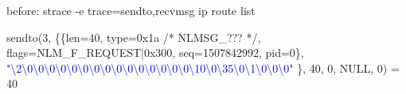 \documentclass[unicode,aspectratio=169]{beamer}
\begin{document}
\begin{frame}[fragile]{\small before: strace -e trace=sendto,recvmsg ip route list}

{\texttt\tiny
\fontsize{6pt}{6pt}\selectfont
sendto(3, \{\{len=40, type=0x1a /* NLMSG\_??? */, flags=NLM\_F\_REQUEST|0x300, seq=1507842992, pid=0\}, \\
\textcolor{blue}{"\textbackslash{}2\textbackslash{}0\textbackslash{}0\textbackslash{}0\textbackslash{}0\textbackslash{}0\textbackslash{}0\textbackslash{}0\textbackslash{}0\textbackslash{}0\textbackslash{}0\textbackslash{}0\textbackslash{}0\textbackslash{}0\textbackslash{}0\textbackslash{}0\textbackslash{}10\textbackslash{}0\textbackslash{}35\textbackslash{}0\textbackslash{}1\textbackslash{}0\textbackslash{}0\textbackslash{}0"}
\}, 40, 0, NULL, 0) = 40

\medskip

}
\end{frame}
\end{document}
